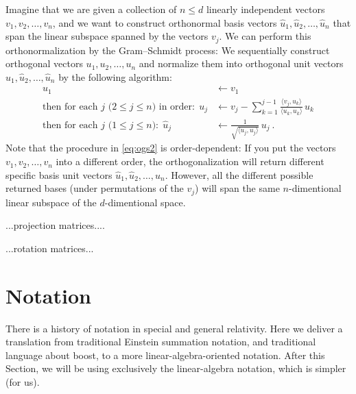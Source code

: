\documentclass{article}
\newcommand{\inner}[2]{\langle{#1},{#2}\rangle}
\begin{document}
Imagine that we are given a collection of $n\leq d$ linearly independent vectors $v_1,v_2,\ldots,v_n$,
and we want to construct orthonormal basis vectors $\hat{u}_1,\hat{u}_2,\ldots,\hat{u}_n$ that span the linear subspace spanned by the vectors $v_j$.
We can perform this orthonormalization by the Gram--Schmidt process:
We sequentially construct orthogonal vectors $u_1,u_2,\ldots,u_n$ and normalize them into orthogonal unit vectors $\hat{u}_1,\hat{u}_2,\ldots,\hat{u}_n$ by the following algorithm:
\begin{align}
    u_1 &\leftarrow v_1 \label{eq:ogs1}
    \\
    \mbox{then for each $j$ ($2\leq j\leq n$) in order:} ~~ u_j &\leftarrow v_j - \sum_{k=1}^{j-1} \frac{\inner{v_j}{u_k}}{\inner{u_k}{u_k}}\,u_k \label{eq:ogs2}
    \\
    \mbox{then for each $j$ ($1\leq j\leq n$):} ~~ \hat{u}_j &\leftarrow \frac{1}{\sqrt{\inner{u_j}{u_j}}}\,u_j ~. \label{eq:ogs3}
\end{align}
Note that the procedure in \eqref{eq:ogs2} is order-dependent: If you put the vectors $v_1,v_2,\ldots,v_n$ into a different order, the orthogonalization will return different specific basis unit vectors $\hat{u}_1,\hat{u}_2,\ldots,\hat{u}_n$.
However, all the different possible returned bases (under permutations of the $v_j$) will span the same $n$-dimentional linear subspace of the $d$-dimentional space.

...projection matrices....

...rotation matrices...

\section{Notation}\label{sec:notation}

There is a history of notation in special and general relativity.
Here we deliver a translation from traditional Einstein summation notation, and traditional language about boost, to a more linear-algebra-oriented notation.
After this Section, we will be using exclusively the linear-algebra notation, which is simpler (for us).
\end{document}
